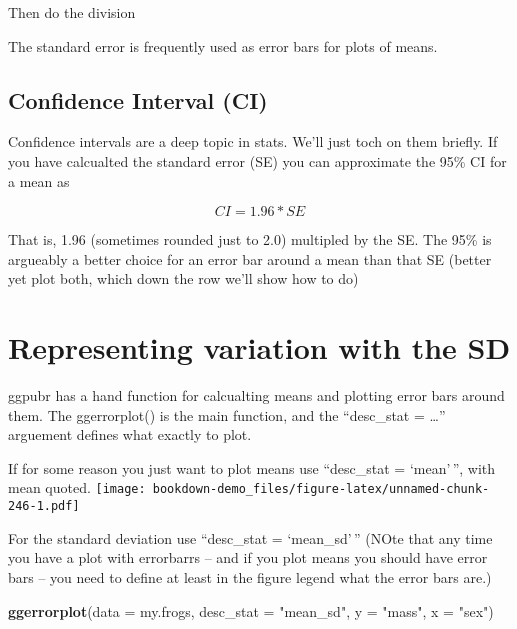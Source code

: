 \documentclass[]{book}
\newenvironment{Shaded}{\begin{snugshade}}{\end{snugshade}}
\newcommand{\KeywordTok}[1]{\textcolor[rgb]{0.13,0.29,0.53}{\textbf{#1}}}
\newcommand{\DataTypeTok}[1]{\textcolor[rgb]{0.13,0.29,0.53}{#1}}
\newcommand{\StringTok}[1]{\textcolor[rgb]{0.31,0.60,0.02}{#1}}
\newcommand{\OperatorTok}[1]{\textcolor[rgb]{0.81,0.36,0.00}{\textbf{#1}}}
\newcommand{\NormalTok}[1]{#1}
\theoremstyle{definition}
\theoremstyle{definition}
\theoremstyle{definition}
\theoremstyle{remark}
\begin{document}
\begin{Shaded}
\end{Shaded}

Then do the division

The standard error is frequently used as error bars for plots of means.

\subsection{Confidence Interval (CI)}\label{confidence-interval-ci}

Confidence intervals are a deep topic in stats. We'll just toch on them
briefly. If you have calcualted the standard error (SE) you can
approximate the 95\% CI for a mean as

\[CI = 1.96*SE\]

That is, 1.96 (sometimes rounded just to 2.0) multipled by the SE. The
95\% is argueably a better choice for an error bar around a mean than
that SE (better yet plot both, which down the row we'll show how to do)

\section{Representing variation with the
SD}\label{representing-variation-with-the-sd}

ggpubr has a hand function for calcualting means and plotting error bars
around them. The ggerrorplot() is the main function, and the
``desc\_stat = \ldots{}'' arguement defines what exactly to plot.

If for some reason you just want to plot means use ``desc\_stat =
`mean'\,'', with mean quoted.
\texttt{[image: bookdown-demo\_files/figure-latex/unnamed-chunk-246-1.pdf]}

For the standard deviation use ``desc\_stat = `mean\_sd'\,'' (NOte that
any time you have a plot with errorbarrs -- and if you plot means you
should have error bars -- you need to define at least in the figure
legend what the error bars are.)

\begin{Shaded}
\begin{Highlighting}[]
\KeywordTok{ggerrorplot}\NormalTok{(}\DataTypeTok{data =}\NormalTok{ my.frogs,}
            \DataTypeTok{desc_stat =} \StringTok{"mean_sd"}\NormalTok{,}
          \DataTypeTok{y =} \StringTok{"mass"}\NormalTok{,}
          \DataTypeTok{x =} \StringTok{"sex"}\NormalTok{)}
\end{Highlighting}
\end{Shaded}
\end{document}
